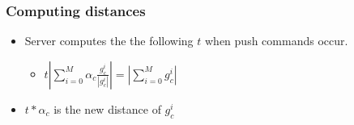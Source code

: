 \begin{frame}
	\frametitle{Computing distances}
	\begin{itemize}
		\item Server computes the the following $t$ when push commands occur.
			\begin{itemize}
				\item $t|\sum_{i=0}^{M}\alpha_{c}\frac{g_{c}^{i}}{|g_{c}^{i}|}|=|\sum_{i=0}^{M}g_{c}^{i}|$
			\end{itemize}
		\item $t*\alpha_{c}$ is the new distance of $g_{c}^{i}$
	\end{itemize}
\end{frame}




